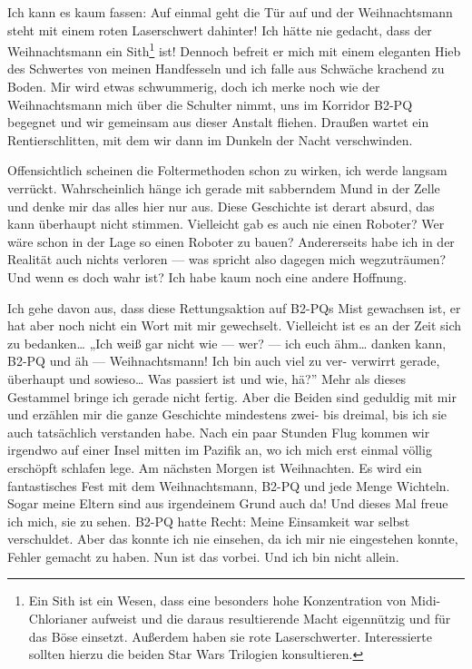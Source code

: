 Ich kann es kaum fassen: Auf einmal geht die Tür auf und der Weihnachtsmann steht mit einem roten Laserschwert dahinter! Ich hätte nie gedacht, dass der Weihnachtsmann ein Sith\footnote{Ein Sith ist ein Wesen, dass eine besonders hohe Konzentration von Midi-Chlorianer aufweist und die daraus resultierende Macht eigennützig und für das Böse einsetzt. Außerdem haben sie rote Laserschwerter. Interessierte sollten hierzu die beiden Star Wars Trilogien konsultieren.} ist! Dennoch befreit er mich mit einem eleganten Hieb des Schwertes von meinen Handfesseln und ich falle aus Schwäche krachend zu Boden. Mir wird etwas schwummerig, doch ich merke noch wie der Weihnachtsmann mich über die Schulter nimmt, uns im Korridor B2-PQ begegnet und wir gemeinsam aus dieser Anstalt fliehen. Draußen wartet ein Rentierschlitten, mit dem wir dann im Dunkeln der Nacht verschwinden.

Offensichtlich scheinen die Foltermethoden schon zu wirken, ich werde langsam verrückt. Wahrscheinlich hänge ich gerade mit sabberndem Mund in der Zelle und denke mir das alles hier nur aus. Diese Geschichte ist derart absurd, das kann überhaupt nicht stimmen. Vielleicht gab es auch nie einen Roboter? Wer wäre schon in der Lage so einen Roboter zu bauen? Andererseits habe ich in der Realität auch nichts verloren — was spricht also dagegen mich wegzuträumen? Und wenn es doch wahr ist? Ich habe kaum noch eine andere Hoffnung.

Ich gehe davon aus, dass diese Rettungsaktion auf B2-PQs Mist gewachsen ist, er hat aber noch nicht ein Wort mit mir gewechselt. Vielleicht ist es an der Zeit sich zu bedanken… „Ich weiß gar nicht wie — wer? — ich euch ähm… danken kann, B2-PQ und äh — Weihnachtsmann! Ich bin auch viel zu ver- verwirrt gerade, überhaupt und sowieso… Was passiert ist und wie, hä?” Mehr als dieses Gestammel bringe ich gerade nicht fertig. Aber die Beiden sind geduldig mit mir und erzählen mir die ganze Geschichte mindestens zwei- bis dreimal, bis ich sie auch tatsächlich verstanden habe. Nach ein paar Stunden Flug kommen wir irgendwo auf einer Insel mitten im Pazifik an, wo ich mich erst einmal völlig erschöpft schlafen lege.
Am nächsten Morgen ist Weihnachten. Es wird ein fantastisches Fest mit dem Weihnachtsmann, B2-PQ und jede Menge Wichteln. Sogar meine Eltern sind aus irgendeinem Grund auch da! Und dieses Mal freue ich mich, sie zu sehen. B2-PQ hatte Recht: Meine Einsamkeit war selbst verschuldet. Aber das konnte ich nie einsehen, da ich mir nie eingestehen konnte, Fehler gemacht zu haben. Nun ist das vorbei. Und ich bin nicht allein.